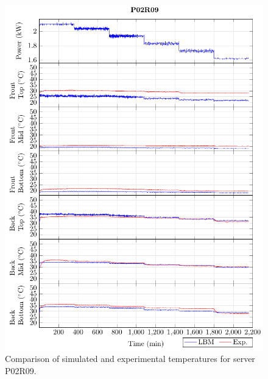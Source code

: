 \begin{figure}[!htb]
\centering
\includegraphics[width=\linewidth]{Plots/P02R09_T.pdf}
\caption{Comparison of simulated and experimental temperatures for server P02R09.}
\label{fig:P02R09_plot}
\end{figure}

\clearpage

